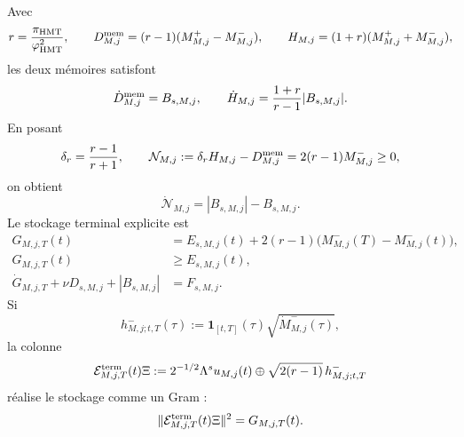 Avec
\begin{equation}
 r=\frac{\pi_{\rm HMT}}{\varphi_{\rm HMT}^2},
 \qquad
 D_{M,j}^{\rm mem}=(r-1)(M_{M,j}^+-M_{M,j}^-),
 \qquad
 H_{M,j}=(1+r)(M_{M,j}^++M_{M,j}^-),
 \label{eq:ns-import-dh}
\end{equation}
les deux mémoires satisfont
\begin{equation}
 \dot D_{M,j}^{\rm mem}=B_{s,M,j},
 \qquad
 \dot H_{M,j}=\frac{1+r}{r-1}|B_{s,M,j}|.
 \label{eq:ns-import-dh-dot}
\end{equation}
En posant
\[
 \delta_r=\frac{r-1}{r+1},
 \qquad
 \mathcal N_{M,j}:=\delta_rH_{M,j}-D_{M,j}^{\rm mem}
 =2(r-1)M_{M,j}^-\ge0,
\]
on obtient
\begin{equation}
 \dot{\mathcal N}_{M,j}=|B_{s,M,j}|-B_{s,M,j}.
 \label{eq:ns-import-negative-memory}
\end{equation}
Le stockage terminal explicite est
\begin{equation}
 \begin{aligned}
 G_{M,j,T}(t)
 &=E_{s,M,j}(t)
   +2(r-1)\bigl(M_{M,j}^-(T)-M_{M,j}^-(t)\bigr),\\
 G_{M,j,T}(t)&\ge E_{s,M,j}(t),\\
 \dot G_{M,j,T}+\nu D_{s,M,j}+|B_{s,M,j}|
 &=F_{s,M,j}.
 \end{aligned}
 \label{eq:ns-import-terminal-storage}
\end{equation}
Si
\[
 h^-_{M,j;t,T}(\tau)
 :=\mathbf1_{[t,T]}(\tau)\sqrt{\dot M^-_{M,j}(\tau)},
\]
la colonne
\begin{equation}
 \mathcal E_{M,j,T}^{\rm term}(t)\Xi
 :=2^{-1/2}\Lambda^su_{M,j}(t)
 \oplus\sqrt{2(r-1)}\,h^-_{M,j;t,T}
 \label{eq:ns-import-terminal-column}
\end{equation}
réalise le stockage comme un Gram :
\begin{equation}
 \|\mathcal E_{M,j,T}^{\rm term}(t)\Xi\|^2
 =G_{M,j,T}(t).
 \label{eq:ns-import-terminal-gram}
\end{equation}

